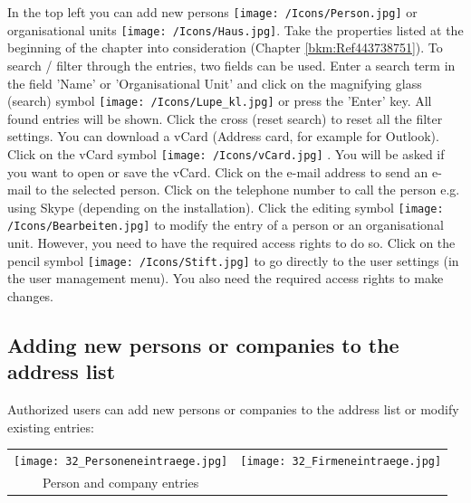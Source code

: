 In the top left you can add new persons \texttt{[image: /Icons/Person.jpg]} or organisational units \texttt{[image: /Icons/Haus.jpg]}. Take the properties listed at the beginning of the chapter into consideration (Chapter \ref{bkm:Ref443738751}). \newline
To search / filter through the entries, two fields can be used. Enter a search term in the field 'Name' or 'Organisational Unit'  and click on the magnifying glass (search) symbol \texttt{[image: /Icons/Lupe\_kl.jpg]}  or press the 'Enter' key. All found entries will be shown. Click the cross (reset search)  to reset all the filter settings. \newline
You can download a vCard (Address card, for example for Outlook). Click on the vCard symbol \texttt{[image: /Icons/vCard.jpg]} . You will be asked if you want to open or 
save the vCard.\newline
Click on the e-mail address  to send an e-mail to the selected person. Click on the telephone number  to call the person e.g. using Skype (depending on the installation).\newline
Click the editing symbol \texttt{[image: /Icons/Bearbeiten.jpg]}  to modify the entry of a person or an organisational unit. However, you need to have the required access rights to do so. Click on the pencil symbol \texttt{[image: /Icons/Stift.jpg]}  to go directly to the user settings (in the user management menu). You also need the required access rights to make changes.

\subsection{Adding new persons or companies to the address list}
Authorized users can add new persons or companies to the address list or modify existing entries:

\vspace{\baselineskip}

\begin{tabular}{cc} %
\texttt{[image: 32\_Personeneintraege.jpg]} & \texttt{[image: 32\_Firmeneintraege.jpg]} \\
Person and company entries \\
\end{tabular}


